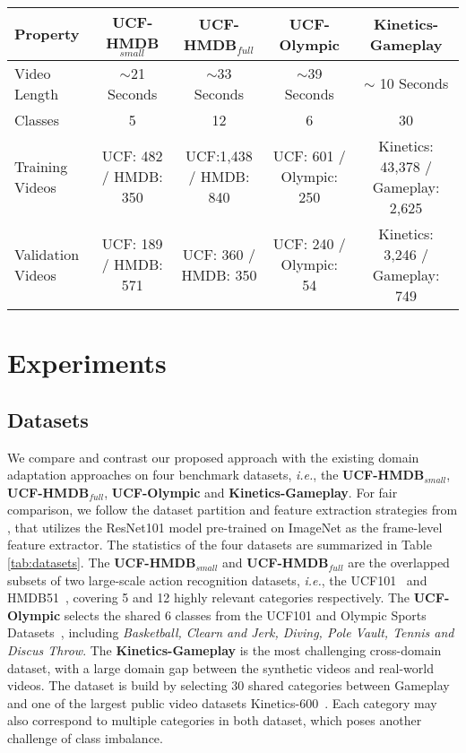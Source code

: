 \begin{table*} 
\centering 
\caption{The general statistics of the four datasets used in our experiments.} \vspace{-0.3cm}\begin{tabular}{l | c c c c } \toprule \textbf{Property} &\textbf{UCF-HMDB$_{small}$} &\textbf{UCF-HMDB$_{full}$} &\textbf{UCF-Olympic} &\textbf{Kinetics-Gameplay} \\ \midrule Video Length & $\sim$21 Seconds & $\sim$33 Seconds &$\sim$39 Seconds &$\sim$ 10 Seconds\\ Classes &5 &12 &6 &30\\ Training Videos &UCF: 482 / HMDB: 350 &UCF:1,438 / HMDB: 840 &UCF: 601 / Olympic: 250 & Kinetics: 43,378 / Gameplay: 2,625 \\ Validation Videos &UCF: 189 / HMDB: 571 &UCF: 360 / HMDB: 350 &UCF: 240 / Olympic: 54 & Kinetics: 3,246 / Gameplay: 749 \\ \bottomrule \end{tabular}
\label{tab:datasets}\vspace{-0.3cm}
\end{table*}
\vspace{-0.2cm}
\section{Experiments}
\subsection{Datasets}
We compare and contrast our proposed approach with the existing domain adaptation approaches on four benchmark datasets, \textit{i.e.}, the \textbf{UCF-HMDB$_{small}$}, \textbf{UCF-HMDB$_{full}$}, \textbf{UCF-Olympic} and \textbf{Kinetics-Gameplay}. For fair comparison, we follow the dataset partition and feature extraction strategies from \cite{TAN}, that utilizes the ResNet101 model pre-trained on ImageNet as the frame-level feature extractor. The statistics of the four datasets are summarized in Table \ref{tab:datasets}. The \textbf{UCF-HMDB$_{small}$} and \textbf{UCF-HMDB$_{full}$} are the overlapped subsets of two large-scale action recognition datasets, \textit{i.e.}, the UCF101~\cite{ucf} and HMDB51~\cite{hmdb}, covering 5 and 12 highly relevant categories respectively. The \textbf{UCF-Olympic} selects the shared 6 classes from the UCF101 and Olympic Sports Datasets~\cite{olympic}, including \textit{Basketball, Clearn and Jerk, Diving, Pole Vault, Tennis and Discus Throw}. The \textbf{Kinetics-Gameplay} is the most challenging cross-domain dataset, with a large domain gap between the synthetic videos and real-world videos. The dataset is build by selecting 30 shared categories between Gameplay~\cite{TAN} and one of the largest public video datasets Kinetics-600~\cite{kinetics}. Each category may also correspond to multiple categories in both dataset, which poses another challenge of class imbalance.
\vspace{-0.3cm}

